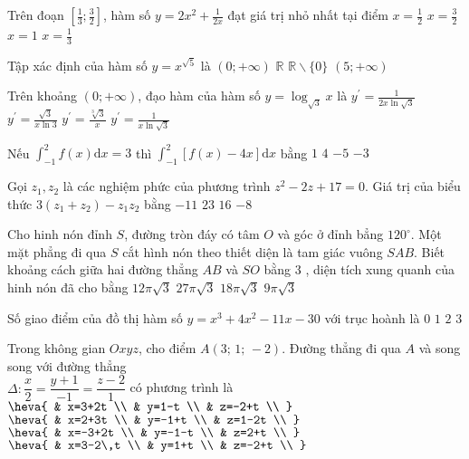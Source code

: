 \begin{ex} %
Trên đoạn $\left[\frac{1}{3} ; \frac{3}{2}\right]$, hàm số $y=2 x^{2}+\frac{1}{2 x}$ đạt giá trị nhỏ nhất tại điểm
\choice
{$x=\frac{1}{2}$}
{\True$x=\frac{3}{2}$}
{$x=1$}
{$x=\frac{1}{3}$}
\end{ex}
\begin{ex} %
Tập xác định của hàm số $y=x^{\sqrt{5}}$ là
\choice
{\True$(0 ;+\infty)$}
{$\mathbb{R}$}
{$\mathbb{R} \backslash\{0\}$}
{$(5 ;+\infty)$}
\end{ex}
\begin{ex} %
Trên khoảng $(0 ;+\infty)$, đạo hàm của hàm số $y=\log _{\sqrt{3}} x$ là
\choice
{$y^{\prime}=\frac{1}{2 x \ln \sqrt{3}}$}
{$y^{\prime}=\frac{\sqrt{3}}{x \ln 3}$}
{$y^{\prime}=\frac{\sqrt[3]{3}}{x}$}
{\True$y^{\prime}=\frac{1}{x \ln \sqrt{3}}$}
\end{ex}
\begin{ex} %
Nếu $\int_{-1}^{2} f(x) \mathrm{d} x=3$ thì $\int_{-1}^{2}[f(x)-4 x] \mathrm{d} x$ bằng
\choice
{$1 $}
{$4$}
{$-5$}
{\True $-3$}
\end{ex}
\begin{ex} %
Gọi $z_{1}, z_{2}$ là các nghiệm phức của phương trình $z^{2}-2 z+17=0$. Giá trị của biểu thức $3\left(z_{1}+z_{2}\right)-z_{1} z_{2}$ bằng 
\choice
{\True $-11$}
{$23$}
{$16$}
{$-8$}
\end{ex}
\begin{ex} %
Cho hinh nón đỉnh $S$, đường tròn đáy có tâm $O$ và góc ở đỉnh bẳng $120^{\circ}$. Một mặt phẳng đi qua $S$ cắt hình nón theo thiết diện là tam giác vuông $S A B$. Biết khoảng cách giữa hai đường thẳng $A B$ và $S O$ bằng 3 , diện tích xung quanh của hinh nón đã cho bằng
\choice
{$12 \pi \sqrt{3}$}
{$27 \pi \sqrt{3}$}
{\True $18 \pi \sqrt{3}$}
{$9 \pi \sqrt{3}$}
\end{ex}

\begin{ex} %
Số giao điểm của đồ thị hàm số $y=x^3+4x^2-11x-30$ với trục hoành là 
\choice 
{ $0$}
{ $1$}
{ $2$}
{\True $3$} 
\end{ex} 
\begin{ex} %
Trong không gian $Oxyz$, cho điểm $A( 3;\,1;\,-2 )$. Đường thẳng đi qua $A$ và song song với đường thẳng\\ $\Delta:\dfrac{x}{2}=\dfrac{y+1}{-1}=\dfrac{z-2}{1}$ có phương trình là
\choice 
{\True $\heva{
& x=3+2t \\ 
& y=1-t \\ 
& z=-2+t \\ 
}$}
{ $\heva{
& x=2+3t \\ 
& y=-1+t \\ 
& z=1-2t \\ 
}$}
{ $\heva{
& x=-3+2t \\ 
& y=-1-t \\ 
& z=2+t \\ 
}$}
{ $\heva{
& x=3-2\,t \\ 
& y=1+t \\ 
& z=-2+t \\ 
}$} 
\end{ex} 

